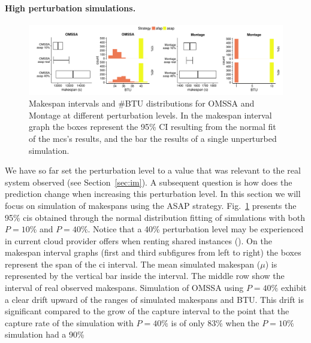 \documentclass[]{llncs}
\begin{document}
\paragraph{High perturbation simulations.}\label{sec:sa}
\begin{figure}
	\includegraphics[width=\textwidth]{gfx/int_plot.pdf}
	\caption[caption]{Makespan intervals and \#BTU distributions for OMSSA and 
	Montage at different perturbation levels. In the makespan interval graph 
	the boxes represent the 95\% CI resulting from the normal fit of the
	\acs{mcs}'s results, and the bar the results of a single unperturbed 
	simulation.%
	}
	\label{fig:int}
\end{figure}
We have so  far set the perturbation level  to a value that was  relevant to the
real system observed  (see Section~\ref{sec:im}).  A subsequent  question is how
does the  prediction change  when increasing this  perturbation level.   In this
section  we will  focus  on simulation  of makespans  using  the ASAP  strategy.
Fig.~\ref{fig:int}  presents  the  95\%  \acp{ci} obtained  through  the  normal
distribution fitting of  simulations with both $P=10\%$ and $P=40\%$.  Notice that a
40\% perturbation level may be experienced in current cloud provider offers when
renting shared  instances (\cite{LeitnerC16}).  On the  makespan interval graphs
(first and third subfigures from left to  right) the boxes represent the span of
the \ac{ci}  interval. The mean  simulated makespan ($\mu{}$) is  represented by
the vertical bar inside the interval. The middle row show the interval of real 
observed makespans.
%
Simulation of OMSSA using $P=40\%$ exhibit a clear drift upward of
the ranges of simulated makespans and BTU. This drift is significant compared to
the grow of the capture interval to the point that the capture rate of the
simulation with $P=40\%$ is of only 83\% when the $P=10\%$ simulation had a 90\% 
\end{document}
